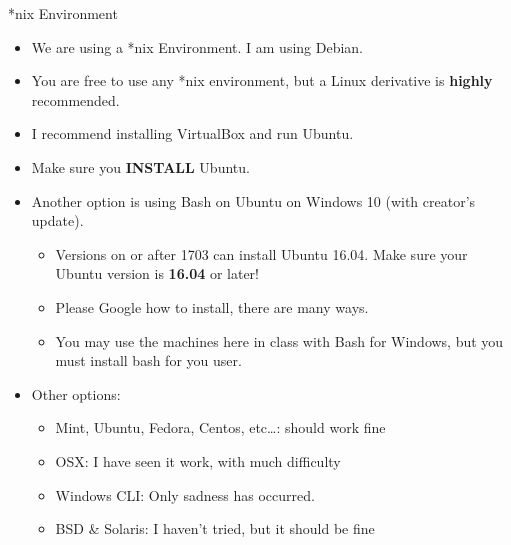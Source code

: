 \documentclass{beamer}
\begin{document}
\begin{frame}{*nix Environment}
\begin{itemize}
\item We are using a *nix Environment.  I am using Debian.
\item You are free to use any *nix environment, but a Linux derivative is \textbf{highly} recommended.
\item I recommend installing VirtualBox and run Ubuntu.
\item Make sure you \textbf{INSTALL} Ubuntu.
\item Another option is using Bash on Ubuntu on Windows 10 (with creator's update).
\begin{itemize}
\item Versions on or after 1703 can install Ubuntu 16.04. Make sure your Ubuntu version is \textbf{16.04} or later!
\item Please Google how to install, there are many ways.
\item You may use the machines here in class with Bash for Windows, but you must install bash for you user.
\end{itemize}
\item Other options:
\begin{itemize}
\item Mint, Ubuntu, Fedora, Centos, etc\ldots: should work fine
\item OSX: I have seen it work, with much difficulty
\item Windows CLI: Only sadness has occurred.
\item BSD \& Solaris: I haven't tried, but it should be fine
\end{itemize}
\end{itemize}
\end{frame}
\end{document}
